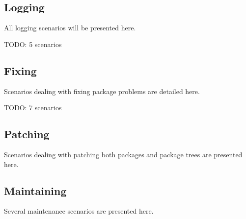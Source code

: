 




\subsection{Logging}
All logging scenarios will be presented here.

TODO: 5 scenarios
%
%
%
%
%


\subsection{Fixing}
Scenarios dealing with fixing package problems are detailed here.

TODO: 7 scenarios
%
%
%
%
%
%
%


\subsection{Patching}
Scenarios dealing with patching both packages and package trees are presented here.





\subsection{Maintaining}
Several maintenance scenarios are presented here.





